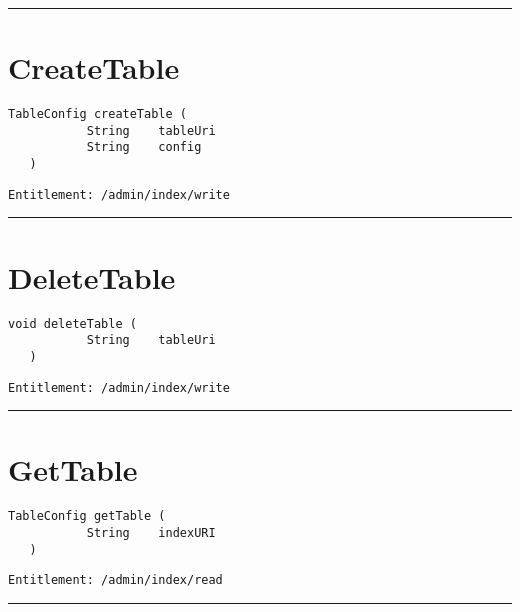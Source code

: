 \rule{12cm}{2pt}
\section{CreateTable}
\label{Api:CreateTable}
\begin{lstlisting}[style=nonumbers]
   TableConfig createTable (
           String    tableUri
           String    config
   )
\end{lstlisting}
\begin{Verbatim}[formatcom=\color{Maroon}]
  Entitlement: /admin/index/write
\end{Verbatim}



\rule{12cm}{2pt}
\section{DeleteTable}
\label{Api:DeleteTable}
\begin{lstlisting}[style=nonumbers]
   void deleteTable (
           String    tableUri
   )
\end{lstlisting}
\begin{Verbatim}[formatcom=\color{Maroon}]
  Entitlement: /admin/index/write
\end{Verbatim}



\rule{12cm}{2pt}
\section{GetTable}
\label{Api:GetTable}
\begin{lstlisting}[style=nonumbers]
   TableConfig getTable (
           String    indexURI
   )
\end{lstlisting}
\begin{Verbatim}[formatcom=\color{Maroon}]
  Entitlement: /admin/index/read
\end{Verbatim}



\rule{12cm}{2pt}
